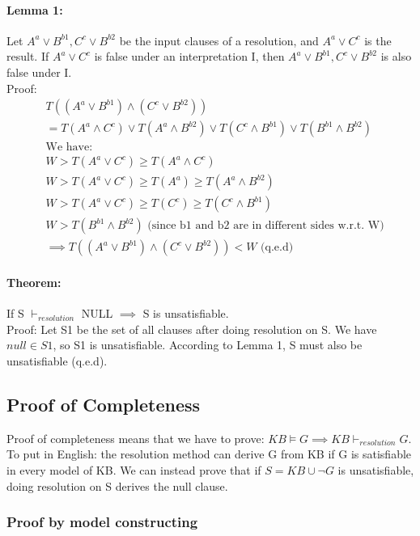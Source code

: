 \documentclass[part1.tex]{subfiles}
\begin{document}
\paragraph{Lemma 1:} Let \(A^a \vee B^{b1}, C^c \vee B^{b2}\) be the input clauses of a resolution, and 
\(A^a \vee C^c\) is the result. If \(A^a \vee C^c\) is false under an interpretation I, then 
\(A^a \vee B^{b1}, C^c \vee B^{b2}\) is also false under I.\\
\indent Proof:
\begin{align*}
	&T((A^a \vee B^{b1}) \wedge (C^c \vee B^{b2}))\\
	&= T(A^a \wedge C^c) \vee T(A^a \wedge B^{b2}) \vee T(C^c \wedge B^{b1}) \vee T(B^{b1} \wedge 
	B^{b2})\\
	&\text{We have:}\\
	&W > T(A^a \vee C^c) \ge T(A^a \wedge C^c)\\
	&W > T(A^a \vee C^c) \ge T(A^a) \ge T(A^a \wedge B^{b2})\\
	&W > T(A^a \vee C^c) \ge T(C^c) \ge T(C^c \wedge B^{b1})\\
	&W > T(B^{b1} \wedge B^{b2}) \text{  (since b1 and b2 are in different sides w.r.t. W)}\\
	&\implies T((A^a \vee B^{b1}) \wedge (C^c \vee B^{b2})) < W \text{ (q.e.d)}
\end{align*}

\paragraph{Theorem:} If S \(\vdash_{resolution}\) NULL \(\implies\) S is unsatisfiable.\\
\indent Proof: Let S1 be the set of all clauses after doing resolution on S. We have \(null \in S1\), so
S1 is unsatisfiable. According to Lemma 1, S must also be unsatisfiable (q.e.d).\\
\subsection{Proof of Completeness}
Proof of completeness means that we have to prove: \(KB \models G \implies KB {\vdash}_{resolution} G\). To put in English: the resolution method can derive G from KB if G is satisfiable in every model of 
KB. We can instead prove that if \(S = KB \cup \neg G\) is unsatisfiable,  doing resolution on
S derives the null clause.\\

\subsubsection{Proof by model constructing}
\end{document}
